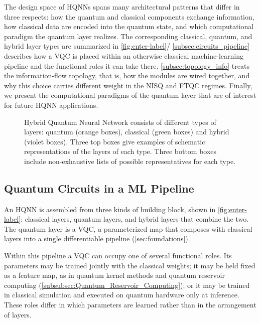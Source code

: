 \documentclass[aps,10pt,groupedaddress,prx,superscriptaddress,twocolumn,balancelastpage, tightenlines]{revtex4-2}
\theoremstyle{plain}  %
\begin{document}

The design space of \glspl{HQNN} spans many architectural patterns that differ in three respects: how the quantum and classical components exchange information, how classical data are encoded into the quantum state, and which computational paradigm the quantum layer realizes. The corresponding classical, quantum, and hybrid layer types are summarized in \autoref{fig:enter-label}/ \autoref{subsec:circuits_pipeline} describes how a \gls{VQC} is placed within an otherwise classical machine-learning pipeline and the functional roles it can take there. \autoref{subsec:topology_info} treats the information-flow topology, that is, how the modules are wired together, and why this choice carries different weight in the \gls{NISQ} and \gls{FTQC} regimes. Finally, we present the computational paradigms of the quantum layer that are of interest for future \gls{HQNN} applications.



\begin{figure}[t!]
    \centering
    
    \caption{Hybrid Quantum Neural Network consists of different types of layers: quantum (orange boxes), classical (green boxes) and hybrid (violet boxes). Three top boxes give examples of schematic representations of the layers of each type. Three bottom boxes include non-exhaustive lists of possible representatives for each
    type.}
    \label{fig:enter-label}
\end{figure}

\subsection{Quantum Circuits in a ML Pipeline}\label{subsec:circuits_pipeline}


An \gls{HQNN} is assembled from three kinds of building block, shown in \autoref{fig:enter-label}: classical layers, quantum layers, and hybrid layers that combine the two. The quantum layer is a \gls{VQC}, a parameterized map that composes with classical layers into a single differentiable pipeline (\autoref{sec:foundations}).

Within this pipeline a \gls{VQC} can occupy one of several functional roles. Its parameters may be trained jointly with the classical weights; it may be held fixed as a feature map, as in quantum kernel methods and quantum reservoir computing (\autoref{subsubsec:Quantum_Reservoir_Computing}); or it may be trained in classical simulation and executed on quantum hardware only at inference. These roles differ in which parameters are learned rather than in the arrangement of layers.
\end{document}
